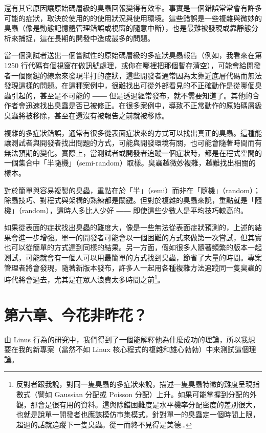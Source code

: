 \documentclass[12pt, a5paper]{book}
\begin{document}
還有其它原因讓原始碼層級的臭蟲回報變得有效率。事實是一個錯誤常常會有許多可能的症狀，取決於使用的的使用狀況與使用環境。這些錯誤是一些複雜與微妙的臭蟲（像是動態記憶體管理錯誤或視窗的隨意中斷），也是最難被發現或靠靜態分析來捕捉，這在長期的開發中造成最多的問題。

當一個測試者送出一個嘗試性的原始碼層級的多症狀臭蟲報告（例如，我看來在第
1250
行代碼有個視窗在做訊號處理，或你在哪裡把那個暫存清空），可能會給開發者一個關鍵的線索來發現半打的症狀，這些開發者通常因為太靠近底層代碼而無法發現這樣的問題。在這種案例中，很難找出可從外部看見的不正確動作是從哪個臭蟲引起的，甚至是不可能的
――
但是透過經常發布，就不需要知道了。其他的合作者會迅速找出臭蟲是否已被修正。在很多案例中，導致不正常動作的原始碼層級臭蟲將被移除，甚至在還沒有被報告之前就被移除。

複雜的多症狀錯誤，通常有很多從表面症狀來的方式可以找出真正的臭蟲。這種能讓測試者與開發者找出問題的方式，可能與開發環境有關，也可能會隨著時間而有無法預期的變化。實際上，當測試者或開發者追蹤一個症狀時，都是在程式空間的一個集合中「半隨機」（semi-random）取樣。臭蟲越微妙複雜，越難找出相關的樣本。

對於簡單與容易複製的臭蟲，重點在於「半」（semi）而非在「隨機」（random）；除蟲技巧、對程式與架構的熟練都是關鍵。但對於複雜的臭蟲來說，重點就是「隨機」（random），這時人多比人少好
―― 即使這些少數人是平均技巧較高的。

如果從表面的症狀找出臭蟲的難度大，像是一些無法從表面症狀預測的，上述的結果會進一步增強。單一的開發者可能會以一個困難的方式來做第一次嘗試，但其實也可以從簡單的方式達到同樣的結果。另一方面，假如很多人隨著頻繁的版本一起測試，可能就會有一個人可以用最簡單的方式找到臭蟲，節省了大量的時間。專案管理者將會發現，隨著新版本發布，許多人一起用各種複雜方法追蹤同一隻臭蟲的時代將會過去，尤其是在眾人浪費太多時間之前\footnote{反對者跟我說，對同一隻臭蟲的多症狀來說，描述一隻臭蟲特徵的難度呈現指數式（譬如
  Gaussian 分配或 Poisson
  分配）上升。如果可能掌握到分配的外觀，那會是很有用的資料。這與除錯困難度是水平機率分配密度的差別很大，也就是說單一開發者也應該模仿市集模式，針對單一的臭蟲定一個時間上限，超過的話就追蹤下一隻臭蟲。從一而終不見得是美德\ldots{}}。

\newpage
\section{第六章、今花非昨花？}\label{ux7b2cux516dux7ae0ux4ecaux82b1ux975eux6628ux82b1}

由 Linus
行為的研究中，我們得到了一個能解釋他為什麼成功的理論，所以我想要在我的新專案（當然不如
Linux 核心程式的複雜和雄心勃勃）中來測試這個理論。
\end{document}

